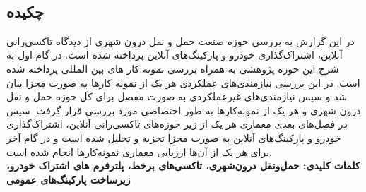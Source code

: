 
\setcounter{page}{1}
\thispagestyle{empty}

~\vfill

\subsection*{چکیده}
\begin{small}
\baselineskip=0.7cm
در این گزارش به بررسی حوزه صنعت حمل و نقل درون شهری از دیدگاه تاکسی‌رانی آنلاین، اشتراک‌گذاری خودرو و پارکینگ‌های آنلاین پرداخته شده است. 
در گام اول به شرح این حوزه پژوهشی به همراه بررسی نمونه کار های بین المللی پرداخته شده است.
در این بررسی نیازمندی‌های عملکردی هر یک از نمونه‌ کارها به صورت مجزا بیان شد و سپس نیازمندی‌های غیرعملکردی به صورت مفصل برای کل حوزه حمل و نقل درون شهری و هر یک از نمونه‌کارها به طور اختصاصی مورد بررسی قرار گرفت.
سپس در فصل‌های بعدی معماری هر یک از زیر حوز‌ه‌های تاکسی‌رانی آنلاین، اشتراک‌گذاری خودرو و پارکینگ‌های آنلاین به صورت مجزا تجزیه و تحلیل شده است و در گام آخر برای هر یک از آن‌ها ارزیابی معماری نمونه‌کارها انجام شده است.
\\
\noindent\textbf{کلمات کلیدی:
حمل‌و‌نقل درون‌شهری، تاکسی‌های برخط، پلترفرم های اشتراک خودرو، زیرساخت پارکینگ‌های عمومی
}
\end{small}